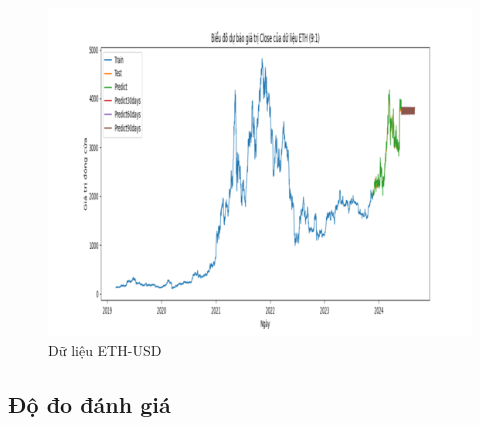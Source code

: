 \documentclass[conference]{IEEEtran}
\begin{document}
\begin{figure}[H]
\begin{minipage}{0.15\textwidth}
    \includegraphics[width=1\textwidth]{Figure/RandomForest_ETH_91.png}
    \end{minipage}
    \caption{Dữ liệu ETH-USD}
    \label{fig:1}
\end{figure}

\subsection{Độ đo đánh giá}
\end{document}
